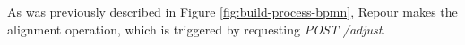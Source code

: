 \documentclass[../main.tex]{subfiles}
\begin{document}
As was previously described in Figure \ref{fig:build-process-bpmn}, Repour makes the alignment operation, which is triggered by requesting \textit{POST /adjust}.
\end{document}
